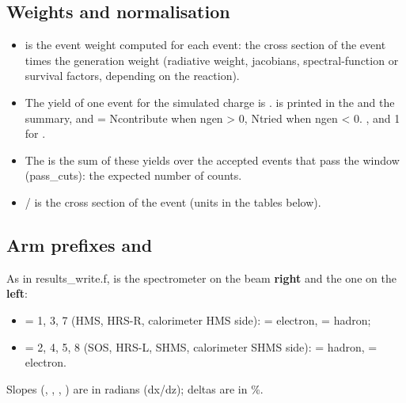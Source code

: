 \subsection{\texorpdfstring{Weights and normalisation}{Weights and normalisation}}\label{user_manual-07u5foutputs:711-weights-and-normalisation}
\begin{itemize}
\item {} is the event weight computed for each event: the cross section of the event times the generation
weight (radiative weight, jacobians, spectral-function or survival factors, depending on the reaction).
\item The yield of one event for the simulated charge \hyperref[param:EXPERu25charge]{} is .  is printed in
the  and the summary, and  = Ncontribute when ngen > 0, Ntried when ngen < 0.
, and 1 for \hyperref[param:doingu5fphsp]{}.
\item The   is the sum of these yields over the accepted events that pass the  window
(pass\_\allowbreak{}cuts): the expected number of counts.
\item {} /  is the cross section of the event (units in the tables below).
\end{itemize}
\subsection{\texorpdfstring{Arm prefixes  and }{Arm prefixes hs* and ss*}}\label{user_manual-07u5foutputs:712-arm-prefixes-hs-and-ss}
As in results\_\allowbreak{}write.\allowbreak{}f,\allowbreak{}  is the spectrometer on the beam \textbf{right} and  the one on the \textbf{left}:

\begin{itemize}
\item \hyperref[param:electronu5farm]{} = 1, 3, 7 (HMS, HRS-R, calorimeter HMS side):  = electron,  = hadron;
\item \hyperref[param:electronu5farm]{} = 2, 4, 5, 8 (SOS, HRS-L, SHMS, calorimeter SHMS side):  = hadron,  = electron.
\end{itemize}
Slopes (, , , ) are in radians (dx/dz); deltas are in \%.

